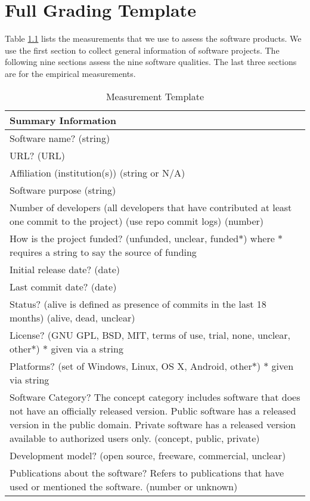 \chapter{Full Grading Template}
\label{ap_grading_template}

Table \ref{measurement_template} lists the measurements that we use to assess the software products. We use the first section to collect general information of software projects. The following nine sections assess the nine software qualities. The last three sections are for the empirical measurements.

\newpage

\begin{table}[H]
\centering
\caption{Measurement Template}\label{measurement_template}
\begin{tabular}{p{14cm}}
\hline
\textbf{Summary Information}\\
\hline
Software name? (string)\\
URL? (URL)\\
Affiliation (institution(s)) (string or {N/A})\\
Software purpose (string)\\
Number of developers (all developers that have contributed at least one commit to the project) (use repo commit logs) (number)\\
How is the project funded? (unfunded, unclear, funded$\ast$) where $\ast$ requires a string to say the source of funding\\
Initial release date? (date)\\
Last commit date? (date)\\
Status? (alive is defined as presence of commits in the last 18 months) ({alive, dead, unclear})\\
License? ({GNU GPL, BSD, MIT, terms of use, trial, none, unclear, other$\ast$}) $\ast$ given via a string \\
Platforms? (set of {Windows, Linux, OS X, Android, other$\ast$}) $\ast$ given via string\\
Software Category? The concept category includes software that does not have an officially released version. Public software has a released version in the public domain. Private software has a released version available to authorized users only. ({concept, public, private})\\
Development model? ({open source, freeware, commercial, unclear})\\
Publications about the software? Refers to publications that have used or mentioned the software. (number or {unknown})\\

\end{tabular}
\end{table}
